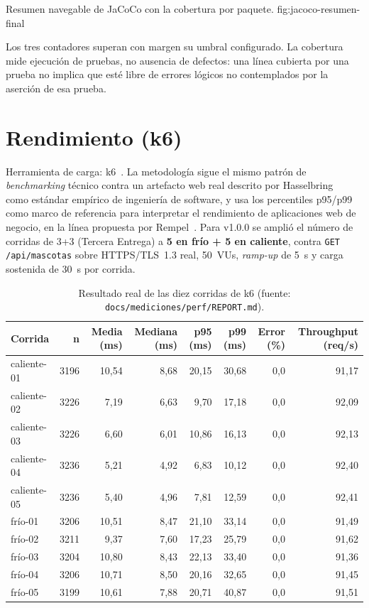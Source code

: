 %
{Resumen navegable de JaCoCo con la cobertura por paquete.}%
{fig:jacoco-resumen-final}

Los tres contadores superan con margen su umbral configurado. La cobertura
mide ejecuci\'on de pruebas, no ausencia de defectos: una l\'inea cubierta
por una prueba no implica que est\'e libre de errores l\'ogicos no
contemplados por la aserci\'on de esa prueba.

\section{Rendimiento (k6)}
\label{sec:rendimiento-final}

Herramienta de carga: k6~\cite{k6-docs}. La metodolog\'ia sigue el mismo
patr\'on de \emph{benchmarking} t\'ecnico contra un artefacto web real
descrito por Hasselbring~\cite{hasselbring2021benchmarking} como est\'andar
emp\'irico de ingenier\'ia de software, y usa los percentiles p95/p99 como
marco de referencia para interpretar el rendimiento de aplicaciones web
de negocio, en la l\'inea propuesta por Rempel~\cite{rempel2015webperf}.
Para v1.0.0 se ampli\'o el n\'umero de corridas de 3+3 (Tercera Entrega) a
\textbf{5 en fr\'io + 5 en caliente}, contra \texttt{GET /api/mascotas}
sobre HTTPS/TLS~1.3 real, 50~VUs, \emph{ramp-up} de 5~s y carga sostenida
de 30~s por corrida.

\begin{table}[H]
  \centering
  \tiny
  \caption{Resultado real de las diez corridas de k6 (fuente: \texttt{docs/mediciones/perf/REPORT.md}).}
  \label{tab:k6-final}
  \begin{tabular}{@{}lrrrrrrr@{}}
    \toprule
    Corrida & n & Media (ms) & Mediana (ms) & p95 (ms) & p99 (ms) & Error (\%) & Throughput (req/s) \\
    \midrule
    caliente-01 & 3196 & 10{,}54 & 8{,}68 & 20{,}15 & 30{,}68 & 0{,}0 & 91{,}17 \\
    caliente-02 & 3226 & 7{,}19 & 6{,}63 & 9{,}70 & 17{,}18 & 0{,}0 & 92{,}09 \\
    caliente-03 & 3226 & 6{,}60 & 6{,}01 & 10{,}86 & 16{,}13 & 0{,}0 & 92{,}13 \\
    caliente-04 & 3236 & 5{,}21 & 4{,}92 & 6{,}83 & 10{,}12 & 0{,}0 & 92{,}40 \\
    caliente-05 & 3236 & 5{,}40 & 4{,}96 & 7{,}81 & 12{,}59 & 0{,}0 & 92{,}41 \\
    fr\'io-01 & 3206 & 10{,}51 & 8{,}47 & 21{,}10 & 33{,}14 & 0{,}0 & 91{,}49 \\
    fr\'io-02 & 3211 & 9{,}37 & 7{,}60 & 17{,}23 & 25{,}79 & 0{,}0 & 91{,}62 \\
    fr\'io-03 & 3204 & 10{,}80 & 8{,}43 & 22{,}13 & 33{,}40 & 0{,}0 & 91{,}36 \\
    fr\'io-04 & 3206 & 10{,}71 & 8{,}50 & 20{,}16 & 32{,}65 & 0{,}0 & 91{,}45 \\
    fr\'io-05 & 3199 & 10{,}61 & 7{,}88 & 20{,}71 & 40{,}87 & 0{,}0 & 91{,}51 \\
    \bottomrule
  \end{tabular}
\end{table}

